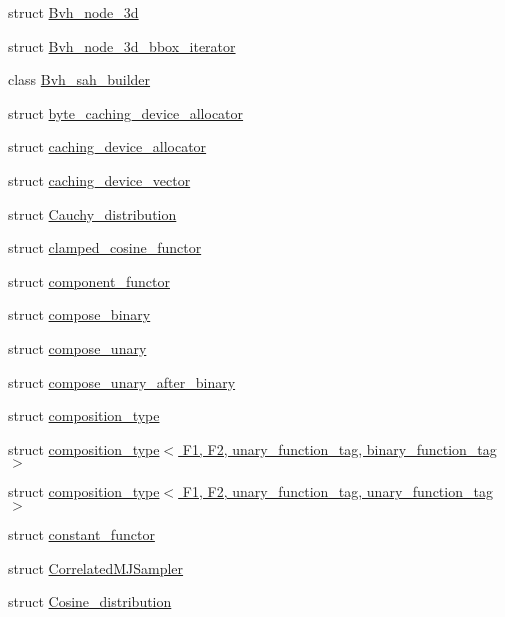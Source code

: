 \begin{DoxyCompactItemize}
\item 
struct \hyperlink{structcugar_1_1_bvh__node__3d}{Bvh\+\_\+node\+\_\+3d}
\item 
struct \hyperlink{structcugar_1_1_bvh__node__3d__bbox__iterator}{Bvh\+\_\+node\+\_\+3d\+\_\+bbox\+\_\+iterator}
\item 
class \hyperlink{classcugar_1_1_bvh__sah__builder}{Bvh\+\_\+sah\+\_\+builder}
\item 
struct \hyperlink{structcugar_1_1byte__caching__device__allocator}{byte\+\_\+caching\+\_\+device\+\_\+allocator}
\item 
struct \hyperlink{structcugar_1_1caching__device__allocator}{caching\+\_\+device\+\_\+allocator}
\item 
struct \hyperlink{structcugar_1_1caching__device__vector}{caching\+\_\+device\+\_\+vector}
\item 
struct \hyperlink{structcugar_1_1_cauchy__distribution}{Cauchy\+\_\+distribution}
\item 
struct \hyperlink{structcugar_1_1clamped__cosine__functor}{clamped\+\_\+cosine\+\_\+functor}
\item 
struct \hyperlink{structcugar_1_1component__functor}{component\+\_\+functor}
\item 
struct \hyperlink{structcugar_1_1compose__binary}{compose\+\_\+binary}
\item 
struct \hyperlink{structcugar_1_1compose__unary}{compose\+\_\+unary}
\item 
struct \hyperlink{structcugar_1_1compose__unary__after__binary}{compose\+\_\+unary\+\_\+after\+\_\+binary}
\item 
struct \hyperlink{structcugar_1_1composition__type}{composition\+\_\+type}
\item 
struct \hyperlink{structcugar_1_1composition__type_3_01_f1_00_01_f2_00_01unary__function__tag_00_01binary__function__tag_01_4}{composition\+\_\+type$<$ F1, F2, unary\+\_\+function\+\_\+tag, binary\+\_\+function\+\_\+tag $>$}
\item 
struct \hyperlink{structcugar_1_1composition__type_3_01_f1_00_01_f2_00_01unary__function__tag_00_01unary__function__tag_01_4}{composition\+\_\+type$<$ F1, F2, unary\+\_\+function\+\_\+tag, unary\+\_\+function\+\_\+tag $>$}
\item 
struct \hyperlink{structcugar_1_1constant__functor}{constant\+\_\+functor}
\item 
struct \hyperlink{structcugar_1_1_correlated_m_j_sampler}{Correlated\+M\+J\+Sampler}
\item 
struct \hyperlink{structcugar_1_1_cosine__distribution}{Cosine\+\_\+distribution}

\end{DoxyCompactItemize}
